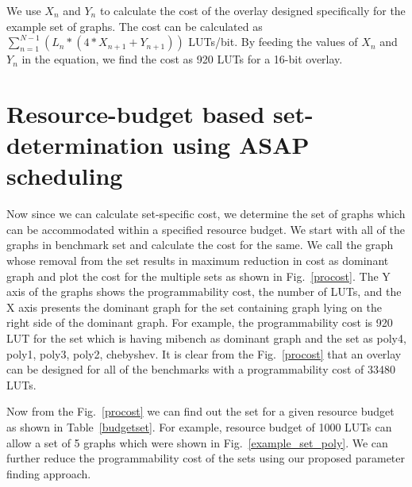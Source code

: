 We use $X_{n}$ and $Y_{n}$ to calculate the cost of the overlay designed specifically for the example set of graphs.
The cost can be calculated as $\displaystyle\sum_{n=1}^{N-1} (L_{n}*(4*X_{n+1}+Y_{n+1}))$ LUTs/bit.
By feeding the values of $X_{n}$ and $Y_{n}$ in the equation, we find the cost as 920 LUTs for a 16-bit overlay.


\section{Resource-budget based set-determination using ASAP scheduling}
Now since we can calculate set-specific cost, we determine the set of graphs which can be accommodated within a specified resource budget.
We start with all of the graphs in benchmark set and calculate the cost for the same.
We call the graph whose removal from the set results in maximum reduction in cost as dominant graph and plot the cost for the multiple sets as shown in Fig.~\ref{procost}.
The Y axis of the graphs shows the programmability cost, the number of LUTs, and the X axis presents the dominant graph for the set containing graph lying on the right side of the dominant graph.
For example, the programmability cost is 920 LUT for the set which is having mibench as dominant graph and the set as {poly4, poly1, poly3, poly2, chebyshev}.
It is clear from the Fig.~\ref{procost} that an overlay can be designed for all of the benchmarks with a programmability cost of 33480 LUTs.








Now from the Fig.~\ref{procost} we can find out the set for a given resource budget as shown in Table~\ref{budgetset}.
For example, resource budget of 1000 LUTs can allow a set of 5 graphs which were shown in Fig.~\ref{example_set_poly}.
We can further reduce the programmability cost of the sets using our proposed parameter finding approach.


